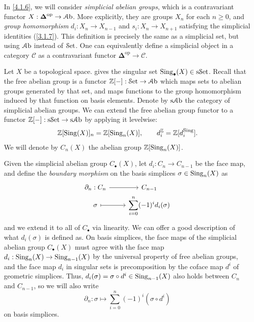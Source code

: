 \begin{remark}\label{4.1.5}
	In \cref{4.1.6}, we will consider \emph{simplicial abelian groups}, which is a contravariant functor $X : \boldsymbol{\Delta} ^{\mathrm{op}}  \to \mathcal{A}\mathrm{b}$. More explicitly, they are groups $X_n$ for each $n\geq 0$, and \emph{group homomorphism} $d_i : X_n \to X_{n-1} $ and $s_i : X_n \to X_{n+1} $ satisfying the simplicial identities (\cref{3.1.7}). This definition is precisely the same as a simplicial set, but using $\mathcal{A}\mathrm{b}$ instead of $\mathcal{S}\mathrm{et} $. One can equivalently define a simplicial object in a category $\mathcal{C} $ as a contravariant functor $\boldsymbol{\Delta} ^{\mathrm{op}} \to \mathcal{C} $.
\end{remark}

\begin{construction}\label{4.1.6}
	Let $X$ be a topological space.  gives the singular set $\operatorname{Sing}_{\bullet} (X)\in \mathrm{s}\mathcal{S}\mathrm{et} $. Recall that the free abelian group is a functor $\mathbb{Z} [-]: \mathcal{S}\mathrm{et}  \to \mathcal{A}\mathrm{b}$ which maps sets to abelian groups generated by that set, and maps functions to the group homomorphism induced by that function on basis elements. Denote by $\mathrm{s} \mathcal{A}\mathrm{b}$ the category of simplicial abelian groups. We can extend the free abelian group functor to a functor $\mathbb{Z} [-]: \mathrm{s}\mathcal{S}\mathrm{et}  \to \mathrm{s} \mathcal{A}\mathrm{b}$ by applying it levelwise:
	\[
		\mathbb{Z} [\operatorname{Sing}(X)]_n=\mathbb{Z} [\operatorname{Sing}_n(X)],\qquad d_i^\mathbb{Z}  = \mathbb{Z} [d_i^{\operatorname{Sing}}]
	.\]
	We will denote by $C_n(X)$ the abelian group $\mathbb{Z} [\operatorname{Sing}_n(X)]$.

	Given the simplicial abelian group $C_{\bullet} (X)$, let $d_i : C_n \to C_{n-1} $ be the face map, and define the \emph{boundary morphism} on the basis simplices $\sigma\in\operatorname{Sing}_n(X)$ as
	\[\begin{tikzcd}[row sep=0em]
	{\partial_n:C_n} & {C_{n-1}} \\
	\sigma & {\displaystyle{\sum_{i=0}^n(-1)^id_i(\sigma)}}
	\arrow[from=1-1, to=1-2]
	\arrow[maps to, from=2-1, to=2-2]
	\end{tikzcd}\]
	and we extend it to all of $C_{\bullet} $ via linearity. We can offer a good description of what $d_i(\sigma)$ is defined as. On basis simplices, the face maps of the simplicial abelian group $C_{\bullet} (X)$ must agree with the face map $d_i : \operatorname{Sing}_n(X) \to \operatorname{Sing}_{n-1} (X)$ by the universal property of free abelian groups, and the face map $d_i$ in singular sets is precomposition by the coface map $d^i$ of geometric simplices. Thus, $d_i(\sigma)=\sigma\circ d^i\in\operatorname{Sing}_{n-1} (X)$ also holds between $C_n$ and $C_{n-1} $, so we will also write
	\[
		\partial_n : \sigma \mapsto \sum_{i=0}^{n} (-1)^i(\sigma\circ d^i)
	\]
	on basis simplices.


\end{construction}
